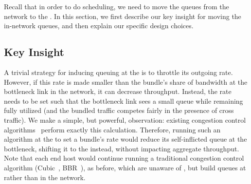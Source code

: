 
Recall that in order to do scheduling, we need to move the queues from the network to the \name. 
In this section, we first describe our key insight for moving the in-network queues, and then explain our specific design choices. 

\subsection{Key Insight}


A trivial strategy for inducing queuing at the \name is to throttle its outgoing rate. However, if this rate is made smaller than the bundle's share of bandwidth at the bottleneck link in the network, it can decrease throughput. Instead, the rate needs to be set such that the bottleneck link sees a small queue while remaining fully utilized (and the bundled traffic competes fairly in the presence of cross traffic). 
We make a simple, but powerful, observation: existing congestion control algorithms~\cite{nimbus, copa} perform exactly this calculation. 
Therefore, running such an algorithm at the \inbox to set a bundle's rate would reduce its self-inflicted queue at the bottleneck, shifting it to the \inbox instead, without impacting aggregate throughput. 
Note that each end host would continue running a traditional congestion control algorithm (\eg Cubic~\cite{cubic}, BBR~\cite{bbr}), as before, which are unaware of \name, but build queues at \inbox rather than in the network.


